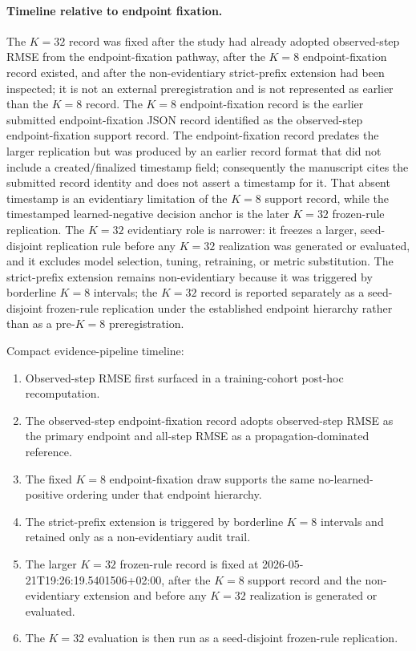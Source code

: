 \documentclass{article}
\begin{document}
\paragraph{Timeline relative to endpoint fixation.}
The $K=32$ record was fixed after the study had already adopted observed-step RMSE from the endpoint-fixation pathway, after the $K=8$ endpoint-fixation record existed, and after the non-evidentiary strict-prefix extension had been inspected; it is not an external preregistration and is not represented as earlier than the $K=8$ record. The $K=8$ endpoint-fixation record is the earlier submitted endpoint-fixation JSON record identified as the observed-step endpoint-fixation support record. The endpoint-fixation record predates the larger replication but was produced by an earlier record format that did not include a created/finalized timestamp field; consequently the manuscript cites the submitted record identity and does not assert a timestamp for it. That absent timestamp is an evidentiary limitation of the $K=8$ support record, while the timestamped learned-negative decision anchor is the later $K=32$ frozen-rule replication. The $K=32$ evidentiary role is narrower: it freezes a larger, seed-disjoint replication rule before any $K=32$ realization was generated or evaluated, and it excludes model selection, tuning, retraining, or metric substitution. The strict-prefix extension remains non-evidentiary because it was triggered by borderline $K=8$ intervals; the $K=32$ record is reported separately as a seed-disjoint frozen-rule replication under the established endpoint hierarchy rather than as a pre-$K=8$ preregistration.

Compact evidence-pipeline timeline:
\begin{enumerate}[leftmargin=*]
  \item Observed-step RMSE first surfaced in a training-cohort post-hoc recomputation.
  \item The observed-step endpoint-fixation record adopts observed-step RMSE as the primary endpoint and all-step RMSE as a propagation-dominated reference.
  \item The fixed $K=8$ endpoint-fixation draw supports the same no-learned-positive ordering under that endpoint hierarchy.
  \item The strict-prefix extension is triggered by borderline $K=8$ intervals and retained only as a non-evidentiary audit trail.
  \item The larger $K=32$ frozen-rule record is fixed at 2026-05-21T19:26:19.5401506+02:00, after the $K=8$ support record and the non-evidentiary extension and before any $K=32$ realization is generated or evaluated.
  \item The $K=32$ evaluation is then run as a seed-disjoint frozen-rule replication.
\end{enumerate}
\end{document}
